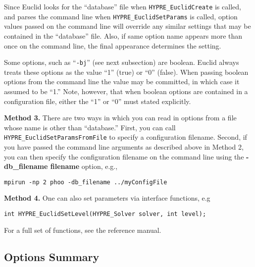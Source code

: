 Since Euclid looks for the ``database'' file when 
{\tt HYPRE\_EuclidCreate} is called, and parses the command line 
when {\tt HYPRE\_EuclidSetParams} is called,
option values passed on the command line will override 
any similar settings that may be contained in the ``database'' file.
Also, if same option name appears more than once on the command 
line, the final appearance determines the setting.

Some options, such as ``{\tt -bj}'' (see next subsection) are boolean.
Euclid always treats these options as the value ``1'' (true)
or ``0'' (false).  
When passing boolean options from the command line
the value may be committed, in which case it assumed to be ``1.''
Note, however, that when boolean options are contained in a
configuration file, either the ``1'' or ``0'' must
stated explicitly.

{\bf Method 3.}
There are two ways in which you can read in options from a file
whose name is other than ``database.''
First, you can call {\tt HYPRE\_EuclidSetParamsFromFile}
to specify a configuration filename.
Second, if you have passed the command line arguments as 
described above in Method 2, 
you can then specify the configuration filename on the command
line using the {\bf -db\_filename filename} option, e.g.,

\begin{display}
\begin{verbatim}
mpirun -np 2 phoo -db_filename ../myConfigFile
\end{verbatim}
\end{display}

{\bf Method 4.}
One can also set parameters via interface functions, e.g
\begin{display}
\begin{verbatim}
int HYPRE_EuclidSetLevel(HYPRE_Solver solver, int level);
\end{verbatim}
\end{display}
For a full set of functions, see the reference manual.


\subsection{Options Summary}

